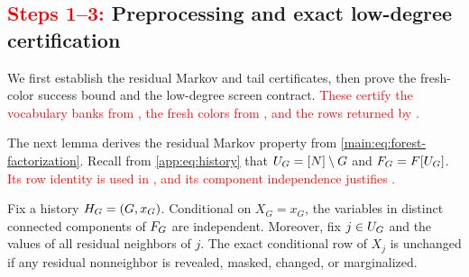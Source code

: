 \subsection{\texorpdfstring{\textcolor{red}{Steps 1--3: }}{Steps 1--3: }Preprocessing and exact low-degree certification}
\label{app:upper-proof-screen}

We first establish the residual Markov and tail certificates, then prove the
fresh-color success bound and the low-degree screen contract.
\textcolor{red}{These certify the vocabulary banks from
, the fresh colors from
, and the rows returned by
.}

The next lemma derives the residual Markov property from
\cref{main:eq:forest-factorization}.
Recall from \eqref{app:eq:history} that
$U_{G}=[N]\setminus G$ and
$F_{G}=F[U_{G}]$.
\textcolor{red}{Its row identity is used in ,
and its component independence justifies .}

\begin{lemma}
\label{app:lem:residual-markov}
Fix a history $H_{G}=(G,x_G)$.  Conditional on $X_G=x_G$, the variables in
distinct connected components of $F_{G}$ are independent.  Moreover,
fix $j\in U_{G}$ and the values of all residual neighbors of $j$.
The exact conditional row of $X_j$ is unchanged if any residual nonneighbor is
revealed, masked, changed, or marginalized.
\end{lemma}

